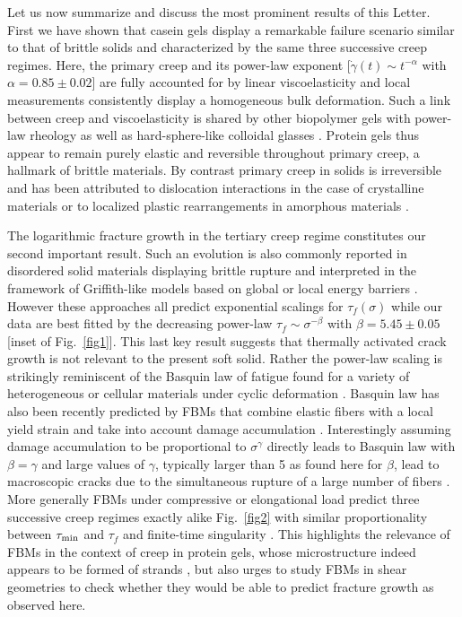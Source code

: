\documentclass[twocolumn,superscriptaddress,showpacs,preprintnumbers,amsmath,amssymb,prl]{revtex4}
\newcommand\gp{\dot\gamma}
\begin{document}
Let us now summarize and discuss the most prominent results of this Letter. First we have shown that casein gels display a remarkable failure scenario similar to that of brittle solids and characterized by the same three successive creep regimes. Here, the primary creep and its power-law exponent [$\gp(t)\sim t^{-\alpha}$ with $\alpha=0.85\pm 0.02$] are fully accounted for by linear viscoelasticity and local measurements consistently display a homogeneous bulk deformation. Such a link between creep and viscoelasticity is shared by other biopolymer gels with power-law rheology \cite{Gobeaux:2010,Jaishankar:2013} as well as hard-sphere-like colloidal glasses \cite{Siebenburger:2012}. Protein gels thus appear to remain purely elastic and reversible throughout primary creep, a hallmark of brittle materials. By contrast primary creep in solids is irreversible and has been attributed to dislocation interactions in the case of crystalline materials \cite{Miguel:2002} or to localized plastic rearrangements in amorphous materials \cite{Rosti:2010}. 

The logarithmic fracture growth in the tertiary creep regime constitutes our second important result. Such an evolution is also commonly reported in disordered solid materials displaying brittle rupture and interpreted in the framework of Griffith-like models based on global or local energy barriers \cite{Vanel:2009}. However these approaches all predict exponential scalings for $\tau_f(\sigma)$ while our data are best fitted by the decreasing power-law $\tau_f \sim \sigma^{-\beta}$ with $\beta=5.45\pm 0.05$ [inset of Fig.~\ref{fig1}]. This last key result suggests that thermally activated crack growth is not relevant to the present soft solid. Rather the power-law scaling is strikingly reminiscent of the Basquin law of fatigue found for a variety of heterogeneous or cellular materials under cyclic deformation \cite{Kun:2007,Basquin:1910,Kohout:2000}. Basquin law has also been recently predicted by FBMs that combine elastic fibers with a local yield strain and take into account damage accumulation \cite{Kun:2007,Halasz:2012}. Interestingly assuming damage accumulation to be proportional to $\sigma^\gamma$ directly leads to Basquin law with $\beta=\gamma$ and large values of $\gamma$, typically larger than 5 as found here for $\beta$, lead to macroscopic cracks due to the simultaneous rupture of a large number of fibers \cite{Halasz:2012}. More generally FBMs under compressive or elongational load predict three successive creep regimes exactly alike Fig.~\ref{fig2} with similar proportionality between $\tau_{\rm min}$ and $\tau_f$ and finite-time singularity \cite{Nechad:2005,Jagla:2011}. This highlights the relevance of FBMs in the context of creep in protein gels, whose microstructure indeed appears to be formed of strands \cite{Kalab:1983,Roefs:1990}, but also urges to study FBMs in shear geometries to check whether they would be able to predict fracture growth as observed here.
\end{document}
